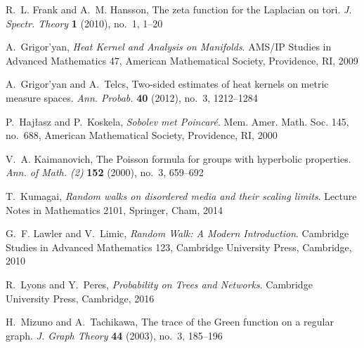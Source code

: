 \documentclass{article}
\numberwithin{equation}{section}
\theoremstyle{definition}
\theoremstyle{remark}
\begin{document}
\begin{thebibliography}{99}
R.~L. Frank and A.~M. Hansson, The zeta function for the Laplacian on tori.
\emph{J. Spectr. Theory} \textbf{1} (2010), no.~1, 1--20

A.~Grigor'yan, \emph{Heat Kernel and Analysis on Manifolds}.
AMS/IP Studies in Advanced Mathematics 47, American Mathematical Society, Providence, RI, 2009

A.~Grigor'yan and A.~Telcs, Two-sided estimates of heat kernels on metric measure spaces.
\emph{Ann. Probab.} \textbf{40} (2012), no.~3, 1212--1284

P.~Hajłasz and P.~Koskela, \emph{Sobolev met Poincaré}.
Mem. Amer. Math. Soc. 145, no.~688, American Mathematical Society, Providence, RI, 2000

V.~A. Kaimanovich, The Poisson formula for groups with hyperbolic properties.
\emph{Ann. of Math. (2)} \textbf{152} (2000), no.~3, 659--692

T.~Kumagai, \emph{Random walks on disordered media and their scaling limits}.
Lecture Notes in Mathematics 2101, Springer, Cham, 2014

G.~F. Lawler and V.~Limic, \emph{Random Walk: A Modern Introduction}.
Cambridge Studies in Advanced Mathematics 123, Cambridge University Press, Cambridge, 2010

R.~Lyons and Y.~Peres, \emph{Probability on Trees and Networks}.
Cambridge University Press, Cambridge, 2016

H.~Mizuno and A.~Tachikawa, The trace of the Green function on a regular graph.
\emph{J. Graph Theory} \textbf{44} (2003), no.~3, 185--196

\end{thebibliography}
\end{document}
